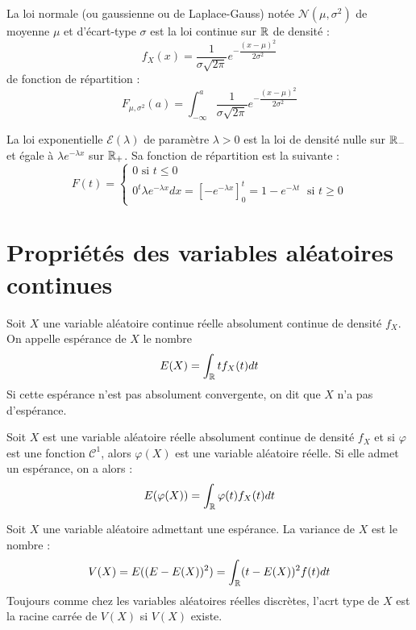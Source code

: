 \begin{definition}
    La loi normale (ou gaussienne ou de Laplace-Gauss) notée $\mathcal{N}(\mu, \sigma^2)$ de moyenne $\mu$ et d'écart-type $\sigma$ est la loi continue sur $\mathbb{R}$ de densité :
        \[ f_X(x) = \dfrac{1}{\sigma \sqrt{2 \pi}} e^{- \dfrac{(x - \mu)^2}{2 \sigma^2}}\]
    de fonction de répartition :
        \[ F_{\mu, \sigma^2}(a) = \int_{ -\infty}^{a} \dfrac{1}{\sigma \sqrt{2 \pi}} e^{- \dfrac{(x - \mu)^2}{2 \sigma^2}} \]
\end{definition}

\begin{definition}
    La loi exponentielle $\mathcal{E}(\lambda)$ de paramètre $\lambda > 0$ est la loi de densité nulle sur $\mathbb{R}_{-}$ et égale à $\lambda e^{-\lambda x}$ sur $\mathbb{R}_+$.
    Sa fonction de répartition est la suivante :
    \[ F(t) = 
        \begin{cases}
            0 \text{ si } t \leq 0 \\
            {0}^{t} \lambda e^{-\lambda x} dx = [- e^{- \lambda x} ]_0^t = 1 - e^{- \lambda t} \; \text{ si } t \geq 0
        \end{cases}
    \]
\end{definition}


\section*{Propriétés des variables aléatoires continues}

\begin{definition}[Espérance]
    Soit $X$ une variable aléatoire continue réelle absolument continue de densité $f_X$.
    On appelle espérance de $X$ le nombre 
        \[ E(X) = \int_{\mathbb{R}} t f_X(t) dt \]
    Si cette espérance n'est pas absolument convergente, on dit que $X$ n'a pas d'espérance.
\end{definition}

\begin{theorem}
    Soit $X$ est une variable aléatoire réelle absolument continue de densité $f_X$ et si $\varphi$ est une fonction $\mathcal{C}^1$, alors $\varphi(X)$ est une variable aléatoire réelle.
    Si elle admet un espérance, on a alors :
        \[ E(\varphi(X)) = \int_{\mathbb{R}} \varphi (t)f_X(t) dt\]
\end{theorem}

\begin{definition}[Variance]
    Soit $X$ une variable aléatoire admettant une espérance. La variance de $X$ est le nombre :
        \[ V(X) = E((E - E(X))^2) = \int_{\mathbb{R}} (t - E(X))^2 f(t) dt \]
    Toujours comme chez les variables aléatoires réelles discrètes, l'acrt type de $X$ est la racine carrée de $V(X)$ si $V(X)$ existe.
\end{definition}

